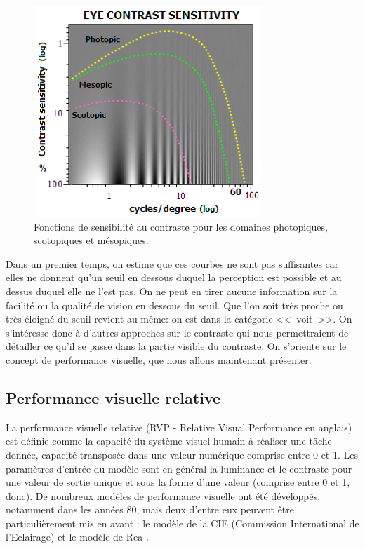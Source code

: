 	\begin{figure}[h]
		\centering
		\includegraphics[scale=.9]{Figures/EyeContrastSensitivity}
		\caption{Fonctions de sensibilité au contraste pour les domaines photopiques, scotopiques et mésopiques.}
		\label{fig:fonction_sensibilite_contraste}
	\end{figure}
	
	\par Dans un premier temps, on estime que ces courbes ne sont pas suffisantes car elles ne donnent qu'un seuil en dessous duquel la perception est possible et au dessus duquel elle ne l'est pas. On ne peut en tirer aucune information sur la facilité ou la qualité de vision en dessous du seuil. Que l'on soit très proche ou très éloigné du seuil revient au même: on est dans la catégorie <<~voit~>>. On s'intéresse donc à d'autres approches sur le contraste qui nous permettraient de détailler ce qu'il se passe dans la partie visible du contraste. On s'oriente sur le concept de performance visuelle, que nous allons maintenant présenter.
	
	\subsection{Performance visuelle relative}	
	\par La performance visuelle relative (RVP - Relative Visual Performance en anglais) est définie comme la capacité du système visuel humain à réaliser une tâche donnée, capacité transposée dans une valeur numérique comprise entre 0 et 1. Les paramètres d'entrée du modèle sont en général la luminance et le contraste pour une valeur de sortie unique et sous la forme d'une valeur (comprise entre 0 et 1, donc). De nombreux modèles de performance visuelle ont été développés, notamment dans les années 80, mais deux d'entre eux peuvent être particulièrement mis en avant : le modèle de la CIE (Commission International de l'Eclairage) \citep{international_commission_on_illumination_analytic_1981} et le modèle de Rea \citep{rea_toward_1986}.
	
